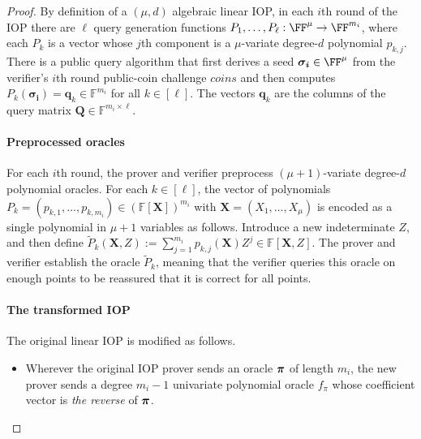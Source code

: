 \begin{proof}
By definition of a $(\mu, d)$ algebraic linear IOP, in each $i$th round of the IOP there are $\ell$ query generation functions $P_1,\ldots,P_\ell: \FF^\mu \rightarrow \FF^{m_i}$, where each $P_k$ is a vector whose $j$th component is a $\mu$-variate degree-$d$ polynomial $p_{k,j}$. There is a public query algorithm that first derives a seed $\boldsymbol{\sigma_i} \in \FF^\mu$ from the verifier's $i$th round public-coin challenge $\mathit{coins}$ and then computes $P_k(\boldsymbol{\sigma_i}) = \mathbf{q}_k \in \mathbb{F}^{m_i}$ for all $k \in [\ell]$. The vectors $\mathbf{q}_k$ are the columns of the query matrix $\mathbf{Q} \in \mathbb{F}^{m_i \times \ell}$.

\paragraph{Preprocessed oracles} 
For each $i$th round, the prover and verifier preprocess $(\mu+1)$-variate degree-$d$ polynomial oracles. %
For each $k \in [\ell]$, the vector of polynomials $P_k = (p_{k,1},\ldots,p_{k, m_i}) \in (\mathbb{F}[\mathbf{X}])^{m_i}$ with $\mathbf{X} = (X_1,\ldots,X_\mu)$ is encoded as a single polynomial in $\mu + 1$ variables as follows. Introduce a new indeterminate $Z$, and then define $\tilde{P}_k(\mathbf{X}, Z) := \sum_{j=1}^{m_i} p_{k,j}(\mathbf{X}) Z^j \in \mathbb{F}[\mathbf{X},Z]$.
The prover and verifier establish the oracle $\tilde{P}_k$, meaning that the verifier queries this oracle on enough points to be reassured that it is correct for all points.

\paragraph{The transformed IOP} 
The original linear IOP is modified as follows. 

\begin{itemize}

\item Wherever the original IOP prover sends an oracle $\boldsymbol{\pi}$ of length $m_i$, the new prover sends a degree $m_i - 1$ univariate polynomial oracle $f_\pi$ whose coefficient vector is \emph{the reverse} of $\boldsymbol{\pi}$. 


\end{itemize}
\end{proof}
